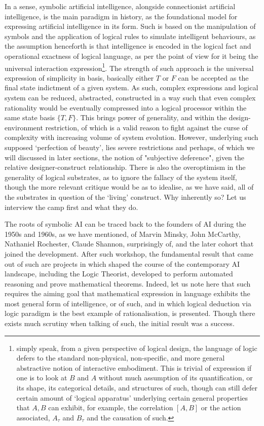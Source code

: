 In a sense, symbolic artificial intelligence, alongside connectionist artificial intelligence, is the main paradigm in history, as the foundational model for expressing artificial intelligence in its form. Such is based on the manipulation of symbols and the application of logical rules to simulate intelligent behaviours, as the assumption henceforth is that intelligence is encoded in the logical fact and operational exactness of logical language, as per the point of view for it being the universal interaction expression\footnote{simply speak, from a given perspective of logical design, the language of logic defers to the standard non-physical, non-specific, and more general abstractive notion of interactive embodiment. This is trivial of expression if one is to look at $B$ and $A$ without much assumption of its quantification, or its shape, its categorical details, and structures of such, though can still defer certain amount of `logical apparatus' underlying certain general properties that $A,B$ can exhibit, for example, the correlation $[A,B]$ or the action associated, $A_{\tau}$ and $B_{\tau}$ and the causation of such.}. The strength of such approach is the universal expression of simplicity in basis, basically either $T$ or $F$ can be accepted as the final state indictment of a given system. As such, complex expressions and logical system can be reduced, abstracted, constructed in a way such that even complex rationality would be eventually compressed into a logical processor within the same state basis $\{T,F\}$. This brings power of generality, and within the design-environment restriction, of which is a valid reason to fight against the curse of complexity with increasing volume of system evolution. However, underlying such supposed `perfection of beauty', lies severe restrictions and perhaps, of which we will discussed in later sections, the notion of "subjective deference", given the relative designer-construct relationship. There is also the overoptimism in the generality of logical substrates, as to ignore the fallacy of the system itself, though the more relevant critique would be as to idealise, as we have said, all of the substrates in question of the `living' construct. Why inherently so? Let us interview the camp first and what they do. 

The roots of symbolic AI can be traced back to the founders of AI during the 1950s and 1960s, as we have mentioned, of Marvin Minsky, John McCarthy, Nathaniel Rochester, Claude Shannon, surprisingly of, and the later cohort that joined the development. After such workshop, the fundamental result that came out of such are projects in which shaped the course of the contemporary AI landscape, including the Logic Theorist, developed to perform automated reasoning and prove mathematical theorems. Indeed, let us note here that such requires the aiming goal that mathematical expression in language exhibits the most general form of intelligence, or of such, and in which logical deduction via logic paradigm is the best example of rationalisation, is presented. Though there exists much scrutiny when talking of such, the initial result was a success. 

